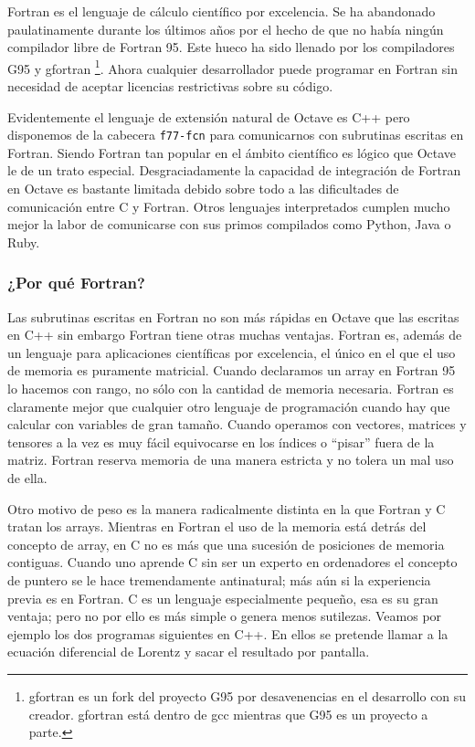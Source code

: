Fortran es el lenguaje de cálculo científico por excelencia. Se ha
abandonado paulatinamente durante los últimos años por el hecho de que
no había ningún compilador libre de Fortran 95. Este hueco ha sido
llenado por los compiladores G95 y gfortran%
\footnote{gfortran es un fork del proyecto G95 por desavenencias en el
  desarrollo con su creador. gfortran está dentro de gcc mientras que
  G95 es un proyecto a parte.%
}. Ahora cualquier desarrollador puede programar en Fortran sin
necesidad de aceptar licencias restrictivas sobre su código.

Evidentemente el lenguaje de extensión natural de Octave es C++ pero
disponemos de la cabecera \texttt{f77-fcn} para comunicarnos con
subrutinas escritas en Fortran. Siendo Fortran tan popular en el
ámbito científico es lógico que Octave le de un trato especial.
Desgraciadamente la capacidad de integración de Fortran en Octave es
bastante limitada debido sobre todo a las dificultades de comunicación
entre C y Fortran.  Otros lenguajes interpretados cumplen mucho mejor
la labor de comunicarse con sus primos compilados como Python, Java o
Ruby.


\subsubsection{¿Por qué Fortran?}

Las subrutinas escritas en Fortran no son más rápidas en Octave que
las escritas en C++ sin embargo Fortran tiene otras muchas ventajas.
Fortran es, además de un lenguaje para aplicaciones científicas por
excelencia, el único en el que el uso de memoria es puramente
matricial.  Cuando declaramos un array en Fortran 95 lo hacemos con
rango, no sólo con la cantidad de memoria necesaria. Fortran es
claramente mejor que cualquier otro lenguaje de programación cuando
hay que calcular con variables de gran tamaño. Cuando operamos con
vectores, matrices y tensores a la vez es muy fácil equivocarse en los
índices o {}``pisar'' fuera de la matriz. Fortran reserva memoria de
una manera estricta y no tolera un mal uso de ella.

Otro motivo de peso es la manera radicalmente distinta en la que
Fortran y C tratan los arrays.  Mientras en Fortran el uso de la
memoria está detrás del concepto de array, en C no es más que una
sucesión de posiciones de memoria contiguas.  Cuando uno aprende C sin
ser un experto en ordenadores el concepto de puntero se le hace
tremendamente antinatural; más aún si la experiencia previa es en
Fortran. C es un lenguaje especialmente pequeño, esa es su gran
ventaja; pero no por ello es más simple o genera menos sutilezas.
Veamos por ejemplo los dos programas siguientes en C++.  En ellos se
pretende llamar a la ecuación diferencial de Lorentz y sacar el
resultado por pantalla.


